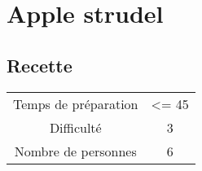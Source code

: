 \newpage
\section{Apple strudel}
    \label{sec:Apple strudel}
    \subsection{Recette}
    \vspace{1cm}


    \begin{center}
        \begin{tabular}{c|c}
            Temps de préparation & <= 45 \\
            Difficulté & 3 \\
            Nombre de personnes & 6 
        \end{tabular}
    \end{center}{}

    \vspace{1cm}
    \hline
    \vspace{1cm}

